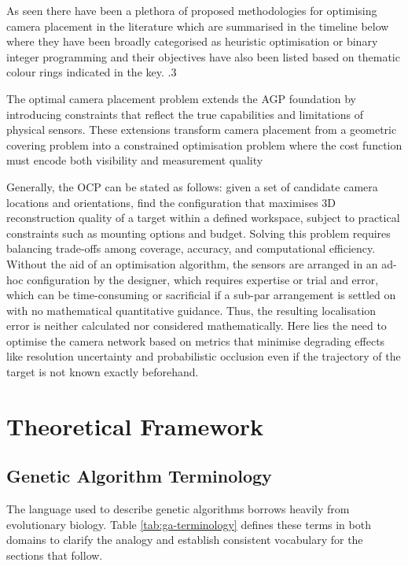 As seen there have been a plethora of proposed methodologies for optimising camera placement in the literature which are summarised in the timeline below where they have been broadly categorised as heuristic optimisation or binary integer programming and their objectives have also been listed based on thematic colour rings indicated in the key. .3

The optimal camera placement problem extends the \gls{AGP} foundation by introducing constraints that reflect the true capabilities and limitations of physical sensors. These extensions transform camera placement from a geometric covering problem into a constrained optimisation problem where the cost function must encode both visibility and measurement quality

Generally, the OCP can be stated as follows: given a set of candidate camera locations and orientations, find the configuration that maximises 3D reconstruction quality of a target within a defined workspace, subject to practical constraints such as mounting options and budget. Solving this problem requires balancing trade-offs among coverage, accuracy, and computational efficiency. Without the aid of an optimisation algorithm, the sensors are arranged in an ad-hoc configuration by the designer, which requires expertise or trial and error, which can be time-consuming or sacrificial if a sub-par arrangement is settled on with no mathematical  quantitative guidance. Thus, the resulting localisation error is neither calculated nor considered mathematically. Here lies the need to optimise the camera network based on metrics that minimise degrading effects like resolution uncertainty and probabilistic occlusion even if the trajectory of the target is not known exactly beforehand.

\section{Theoretical Framework}
\subsection{Genetic Algorithm Terminology}
The language used to describe genetic algorithms borrows heavily from evolutionary biology. Table \ref{tab:ga-terminology} defines these terms in both domains to clarify the analogy and establish consistent vocabulary for the sections that follow.

